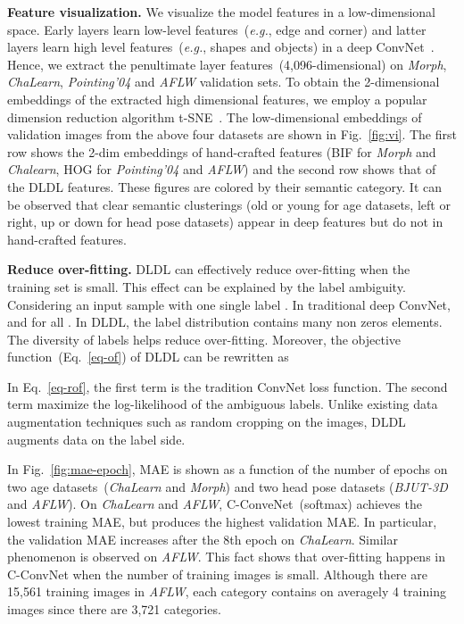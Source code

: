\documentclass[journal]{IEEEtran}
\begin{document}
\textbf{Feature visualization.}
We visualize the model features in a low-dimensional space. Early layers learn low-level features~(\emph{e.g.}, edge and corner) and latter layers learn high level features~(\emph{e.g.}, shapes and objects) in a deep ConvNet~\cite{zeiler2014visualizing}. Hence, we extract the penultimate layer features~(4,096-dimensional) on \emph{Morph}, \emph{ChaLearn}, \emph{Pointing'04} and \emph{AFLW} validation sets. To obtain the 2-dimensional embeddings of the extracted high dimensional features, we employ a popular dimension reduction algorithm t-SNE~\cite{van2008vis}. The low-dimensional embeddings of validation images from the above four datasets are shown in Fig.~\ref{fig:vi}. The first row shows the 2-dim embeddings of hand-crafted features (BIF for \emph{Morph} and \emph{Chalearn}, HOG for \emph{Pointing'04} and \emph{AFLW}) and the second row shows that of the DLDL features. These figures are colored by their semantic category. It can be observed that clear semantic clusterings (old or young for age datasets, left or right, up or down for head pose datasets) appear in deep features but do not in hand-crafted features.

\textbf{Reduce over-fitting.}
DLDL can effectively reduce over-fitting when the training set is small. This effect can be explained by the label ambiguity. Considering an input sample  with one single label . In traditional deep ConvNet,  and  for all . In DLDL, the label distribution  contains many non zeros elements. The diversity of labels helps reduce over-fitting. Moreover, the objective function~(Eq.~\ref{eq-of}) of DLDL can be rewritten as
 
 In Eq.~\ref{eq-rof}, the first term is the tradition ConvNet loss function. The second term maximize the log-likelihood of the ambiguous labels. Unlike existing data augmentation techniques such as random cropping on the images, DLDL augments data on the label side.

 In Fig.~\ref{fig:mae-epoch}, MAE is shown as a function of the number of epochs on two age datasets~(\emph{ChaLearn} and \emph{Morph}) and two head pose datasets (\emph{BJUT-3D} and \emph{AFLW}). On \emph{ChaLearn} and \emph{AFLW}, C-ConveNet~(softmax) achieves the lowest training MAE, but produces the highest validation MAE. In particular, the validation MAE  increases after the 8th epoch on \emph{ChaLearn}. Similar phenomenon is observed on \emph{AFLW}. This fact shows that over-fitting happens in C-ConvNet when the number of training images is small. Although there are 15,561 training images in \emph{AFLW}, each category contains on averagely 4 training images since there are 3,721 categories.
\end{document}
